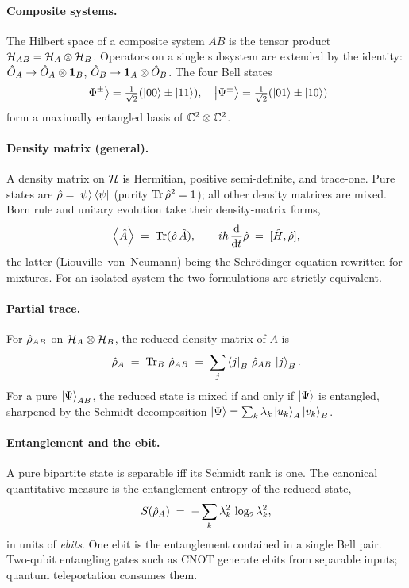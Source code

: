 \clearpage
\begin{chaptersummary}

\paragraph{Composite systems.}
The Hilbert space of a composite system $AB$ is the tensor product
$\mathcal{H}_{AB}=\mathcal{H}_A\otimes\mathcal{H}_B$. Operators on a single
subsystem are extended by the identity:
$\hat{O}_A\to\hat{O}_A\otimes\mathbf{1}_B$,
$\hat{O}_B\to\mathbf{1}_A\otimes\hat{O}_B$. The four Bell states
\begin{equation}
\ket{\Phi^\pm}=\tfrac{1}{\sqrt 2}(\ket{00}\pm\ket{11}),\quad
\ket{\Psi^\pm}=\tfrac{1}{\sqrt 2}(\ket{01}\pm\ket{10})
\end{equation}
form a maximally entangled basis of $\mathbb{C}^2\otimes\mathbb{C}^2$.

\paragraph{Density matrix (general).}
A density matrix on $\mathcal{H}$ is Hermitian, positive semi-definite,
and trace-one. Pure states are
$\hat{\rho}=\ket{\psi}\bra{\psi}$ (purity $\operatorname{Tr}\hat{\rho}^2=1$);
all other density matrices are mixed. Born rule and unitary
evolution take their density-matrix forms,
\begin{equation}
\expval{\hat{A}} \;=\; \operatorname{Tr}(\hat{\rho}\,\hat{A}),
\qquad
i\hbar\,\dv{t}\hat{\rho} \;=\; [\hat{H},\hat{\rho}],
\end{equation}
the latter (Liouville--von~Neumann) being the Schr\"odinger
equation rewritten for mixtures. For an isolated system the two
formulations are strictly equivalent.

\paragraph{Partial trace.}
For $\hat{\rho}_{AB}$ on $\mathcal{H}_A\otimes\mathcal{H}_B$, the reduced
density matrix of $A$ is
\begin{equation}
\hat{\rho}_A \;=\; \operatorname{Tr}_B\,\hat{\rho}_{AB}
\;=\; \sum_j\bra{j}_B\,\hat{\rho}_{AB}\,\ket{j}_B.
\end{equation}
For a pure $\ket{\Psi}_{AB}$, the reduced state is mixed if and
only if $\ket{\Psi}$ is entangled, sharpened by the Schmidt
decomposition $\ket{\Psi}=\sum_k\lambda_k\ket{u_k}_A\ket{v_k}_B$.

\paragraph{Entanglement and the ebit.}
A pure bipartite state is separable iff its Schmidt rank is one.
The canonical quantitative measure is the entanglement entropy of
the reduced state,
\begin{equation}
S(\hat{\rho}_A) \;=\; -\sum_k\lambda_k^2\,\log_2\lambda_k^2,
\end{equation}
in units of \emph{ebits}. One ebit is the entanglement contained
in a single Bell pair. Two-qubit entangling gates such as CNOT
generate ebits from separable inputs; quantum teleportation
consumes them.


\end{chaptersummary}
